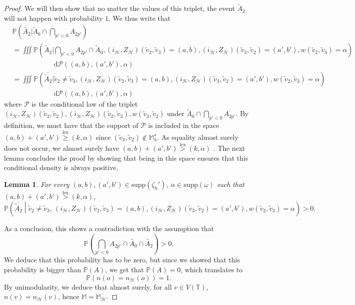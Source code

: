 \documentclass[11pt]{article}
\DeclareMathOperator{\lex}{lex}
\newtheorem{lemma}[prop]{Lemma}
\begin{document}
\begin{proof}
We will then show that no matter the values of this triplet, the event $\tilde A_{2}$ will not happen with probability $1$. We thus write that
\begin{align*}
    &\mathbb{P}\left(\overline{\tilde{A_{2}}} \bigg| \tilde A_0 \cap \bigcap_{p' < 0} A_{2p'}\right) \\
    &=\iiint \mathbb{P}\left(\overline{\tilde{A}_{2}} \bigg| \bigcap_{p' <0} A_{2p'}\cap \tilde{A}_0, (i_\mathcal{H},Z_{\mathcal{H}})(\tilde{v}_{2},\tilde{v}_{3})=(a,b), (i_\mathcal{H},Z_{\mathcal{H}})(\tilde{v}_{3},\tilde{v}_{2})=(a',b'), w(\tilde{v}_{2},\tilde{v}_{3})=\alpha  \right)\\
    &\qquad \qquad \qquad \mathrm{d}\mathcal{P}((a,b),(a',b'),\alpha) \\
    &=\iiint \mathbb{P}\left(\overline{\tilde{A}_{2}} \bigg| \tilde{v}_2 \neq \tilde{v}_3, (i_\mathcal{H},Z_{\mathcal{H}})(\tilde{v}_{2},\tilde{v}_{3})=(a,b), (i_\mathcal{H},Z_{\mathcal{H}})(\tilde{v}_{3},\tilde{v}_{2})=(a',b'), w(\tilde{v}_{2},\tilde{v}_{3})=\alpha  \right)\\
    &\qquad \qquad \qquad \mathrm{d}\mathcal{P}((a,b),(a',b'),\alpha )
\end{align*}
where $\mathcal{P}$ is the conditional law of the triplet $(i_{\mathcal{H}},Z_{\mathcal{H}})(\tilde{v}_{3},\tilde{v}_{2}),(i_{\mathcal{H}},Z_{\mathcal{H}})(\tilde{v}_{2},\tilde{v}_{3}) ,w(\tilde{v}_{3},\tilde{v}_{2})$ under $\tilde{A}_0\cap\bigcap_{p' < 0} A_{2p'}$. By definition, we must have that the support of $\mathcal{P}$ is included in the space $(a,b)+(a',b') \overset{\lex}{\geq }(k,\alpha)$ since $(\tilde{v}_{3},\tilde{v}_{2}) \notin \mathbb{M}_h^s$. As equality almost surely does not occur, we almost surely have $(a,b)+(a',b') \overset{\lex}{> }(k,\alpha)$ . The next lemma concludes the proof by showing that being in this space ensures that this conditional density is always positive.
\begin{lemma}\label{lem:Mhstop}
    For every $(a,b),(a',b') \in \mathrm{supp}(\zeta_{h}')$, $ \alpha \in \mathrm{supp} (\omega)$ such that $(a,b)+(a',b')\overset{\lex}{>}(k,\alpha)$, \[ \mathbb{P} \left( \overline{\tilde A_{2}} \middle| \tilde{v}_2 \neq \tilde{v}_3 , \,(i_\mathcal{H},Z_{\mathcal{H}})(\tilde{v}_{2},\tilde{v}_{3})=(a,b), (i_\mathcal{H},Z_{\mathcal{H}})(\tilde{v}_{3},\tilde{v}_{2})=(a',b'), w(\tilde{v}_{2},\tilde{v}_{3})=\alpha \right)    >0   . \]
\end{lemma}
As a conclusion, this shows a contradiction with the assumption that  \[  \mathbb{P}\left(  \bigcap_{p'<0}A_{2p'} \cap \tilde{A_0}\cap \tilde{A_2} \right)>0.\]
We deduce that this probability has to be zero, but since we showed that this probability is bigger than $\mathbb{P}(A)$, we get that $\mathbb{P}(A)=0$, which translates to
\[ \mathbb{P}(n(o)=n_{\mathcal{H}}(o))=1.  \]
By unimodularity, we deduce that almost surely, for all $v \in V(\mathbb{T})$, $n(v)=n_{\mathcal{H}}(v)$, hence $\mathbb{M}=\mathbb{M}_{\mathcal{H}}$.

\end{proof}
\end{document}
